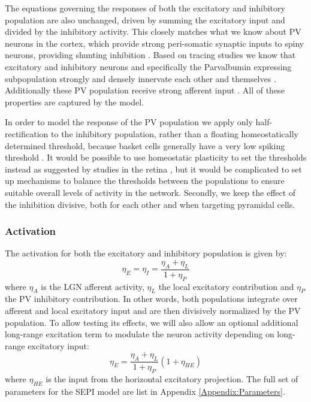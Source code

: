 The equations governing the responses of both the excitatory and
inhibitory population are also unchanged, driven by summing the
excitatory input and divided by the inhibitory activity. This closely
matches what we know about PV neurons in the cortex, which provide
strong peri-somatic synaptic inputs to spiny neurons, providing
shunting inhibition \citep{Atallah2012, Wilson2012}. Based on tracing
studies we know that excitatory and inhibitory neurons and
specifically the Parvalbumin expressing subpopulation strongly and
densely innervate each other and themselves \citep{Buzas2001, Ma2011,
  Pfeffer2013}. Additionally these PV population receive strong
afferent input \citep{Burkhalter2008}. All of these properties are
captured by the model.

In order to model the response of the PV population we apply only
half-rectification to the inhibitory population, rather than a
floating homeostatically determined threshold, because basket cells
generally have a very low spiking threshold \citep{Ma2011}.  It would
be possible to use homeostatic plasticity to set the thresholds
instead as suggested by studies in the retina \citep{Hennig2011}, but
it would be complicated to set up mechanisms to balance the thresholds
between the populations to ensure suitable overall levels of activity
in the network. Secondly, we keep the effect of the inhibition
divisive, both for each other and when targeting pyramidal cells.

\subsubsection{Activation}

The activation for both the excitatory and inhibitory population is
given by:
\begin{equation}
  \eta_E = \eta_I = \frac{\eta_{A} + \eta_{L}}{1 + \eta_{P}}
\end{equation}
where $\eta_{A}$ is the LGN afferent activity, $\eta_{L}$ the local
excitatory contribution and $\eta_{P}$ the PV inhibitory
contribution. In other words, both populations integrate over afferent
and local excitatory input and are then divisively normalized by the
PV population. To allow testing its effects, we will also allow an
optional additional long-range excitation term to modulate the neuron
activity depending on long-range excitatory input:
\begin{equation}
  \eta_{E} = \frac{\eta_{A} + \eta_{L}}{1 + \eta_{P}} (1+\eta_{HE})
\end{equation}
where $\eta_{HE}$ is the input from the horizontal excitatory
projection. The full set of parameters for the SEPI model are list in
Appendix \ref{Appendix:Parameters}.

